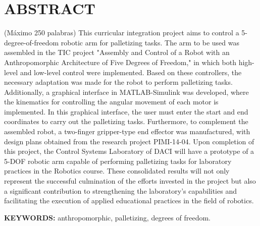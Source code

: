  
\chapter*{\centering ABSTRACT}


\justifying
(Máximo 250 palabras)
This curricular integration project aims to control a 5-degree-of-freedom robotic arm for palletizing tasks. The arm to be used was assembled in the TIC project "Assembly and Control of a Robot with an Anthropomorphic Architecture of Five Degrees of Freedom," in which both high-level and low-level control were implemented. Based on these controllers, the necessary adaptation was made for the robot to perform palletizing tasks. Additionally, a graphical interface in MATLAB-Simulink was developed, where the kinematics for controlling the angular movement of each motor is implemented. In this graphical interface, the user must enter the start and end coordinates to carry out the palletizing tasks. Furthermore, to complement the assembled robot, a two-finger gripper-type end effector was manufactured, with design plans obtained from the research project PIMI-14-04. Upon completion of this project, the Control Systems Laboratory of DACI will have a prototype of a 5-DOF robotic arm capable of performing palletizing tasks for laboratory practices in the Robotics course. These consolidated results will not only represent the successful culmination of the efforts invested in the project but also a significant contribution to strengthening the laboratory's capabilities and facilitating the execution of applied educational practices in the field of robotics.

\vspace{1cm}
\noindent \textbf{KEYWORDS:} anthropomorphic, palletizing, degrees of freedom.

\newpage
